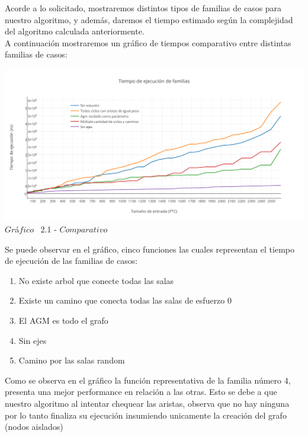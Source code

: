 \indent Acorde a lo solicitado, mostraremos distintos tipos de familias de casos para nuestro algoritmo, y adem\'as, daremos el tiempo estimado 
seg\'un la complejidad del algoritmo calculada anteriormente.\\

A continuaci\'on mostraremos un gr\'afico de tiempos comparativo entre distintas familias de casos:\\ 

\vspace*{0.3cm} \vspace*{0.3cm}
  \begin{center}
 \includegraphics[scale=0.65]{./EJ2/comparativo.png}
 {$Gr$\'a$fico$ \ 2.1 - $Comparativo$}
  \end{center}
  \vspace*{0.3cm}
  
Se puede observar en el gr\'afico, cinco funciones las cuales representan el tiempo de ejecuci\'on de las familias de casos:\\
\begin{enumerate}
\item No existe arbol que conecte todas las salas
\item Existe un camino que conecta todas las salas de esfuerzo 0
\item El AGM es todo el grafo
\item Sin ejes
\item Camino por las salas random
\end{enumerate}

Como se observa en el gr\'afico la funci\'on representativa de la familia n\'umero 4, presenta una mejor performance en relaci\'on a las otras. Esto se debe a que nuestro algoritmo al intentar chequear las aristas, observa que no hay ninguna por lo tanto finaliza su ejecuci\'on insumiendo unicamente la creaci\'on del grafo (nodos aislados)

